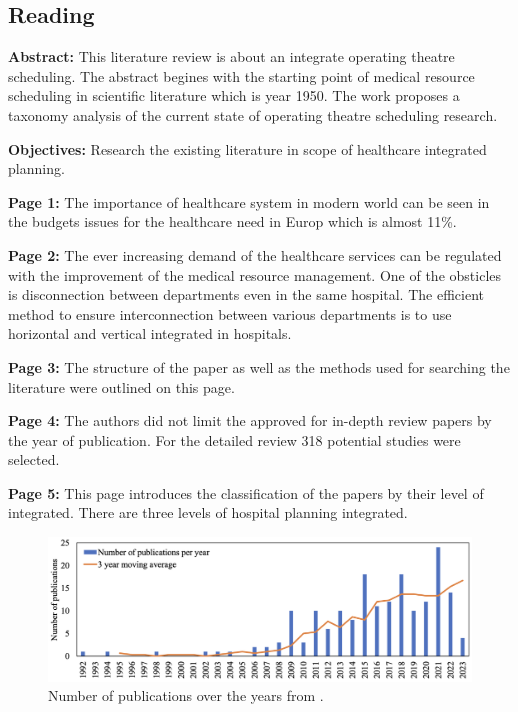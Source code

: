 \subsection{Reading}
    \textbf{Abstract:}
    This literature review is about an integrate operating theatre scheduling. The abstract begines with the starting point of medical resource scheduling in scientific literature which is year 1950. The work proposes a taxonomy analysis of the current state of operating theatre scheduling research.
    
    \textbf{Objectives:}
    Research the existing literature in scope of healthcare integrated planning.

    
    \textbf{Page 1:}
    The importance of healthcare system in modern world can be seen in the budgets issues for the healthcare need in Europ which is almost 11\%.
    
    \textbf{Page 2:}
    The ever increasing demand of the healthcare services can be regulated with the improvement of the medical resource management. One of the obsticles is disconnection between departments even in the same hospital. The efficient method to ensure interconnection between various departments is to use horizontal and vertical integrated in hospitals.
    
    \textbf{Page 3:}
    The structure of the paper as well as the methods used for searching the literature were outlined on this page.
    
    \textbf{Page 4:}
    The authors did not limit the approved for in-depth review papers by the year of publication. For the detailed review 318 potential studies were selected.
    
    \textbf{Page 5:}
    This page introduces the classification of the papers by their level of integrated. There are three levels of hospital planning integrated.
    \begin{figure}[H]
        \centering
        \includegraphics[width=1\textwidth]{figures/SR0010NL23/fig1.png}
        \caption{Number of publications over the years from \cite{x338}.}
        \label{fig1:SR0010NL23}
    \end{figure}
    
